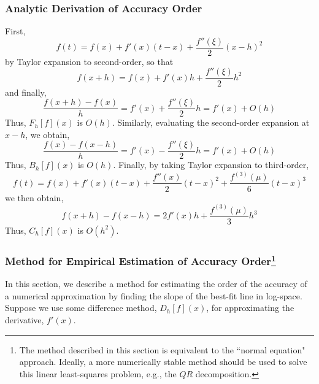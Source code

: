 \documentclass[11pt]{article}
\begin{document}
\subsubsection{Analytic Derivation of Accuracy Order}
\label{subsection:accuracy-order-derivation}
First, 
$$
    f(t) = f(x) + f'(x)(t-x) + \frac{f''(\xi)}{2}(x-h)^2
$$
by Taylor expansion to second-order, so that
$$
    f(x+h) = f(x) + f'(x)h + \frac{f''(\xi)}{2}h^2
$$
and finally,
$$
    \frac{f(x+h)-f(x)}{h} = f'(x) + \frac{f''(\xi)}{2}h = f'(x) + O(h)
$$
Thus, $F_h[f](x)$ is $O(h)$. Similarly, evaluating the second-order expansion at $x-h$, we obtain, 
$$
    \frac{f(x)-f(x-h)}{h} = f'(x) - \frac{f''(\xi)}{2}h = f'(x) + O(h)
$$
Thus, $B_h[f](x)$ is $O(h)$. Finally, by taking Taylor expansion to third-order,
$$
    f(t) = f(x) + f'(x)(t-x) + \frac{f''(x)}{2}(t-x)^2 + \frac{f^{(3)}(\mu)}{6}(t-x)^3
$$
we then obtain,
$$
    f(x+h)-f(x-h) = 2f'(x)h  + \frac{f^{(3)}(\mu)}{3}h^3
$$
Thus, $C_h[f](x)$ is $O(h^2)$.

\subsubsection{Method for Empirical Estimation of Accuracy Order\protect\footnote{The method described in this section is equivalent to the ``normal equation" approach. Ideally, a more numerically stable method should be used to solve this linear least-squares problem, e.g., the $QR$ decomposition.}}

\label{subsection:accuracy-estimate}

In this section, we describe a method for estimating the order of the accuracy of a numerical approximation by finding the slope of the best-fit line in log-space. Suppose we use some difference method, $D_h[f](x)$, for approximating the derivative, $f'(x)$.
\end{document}
